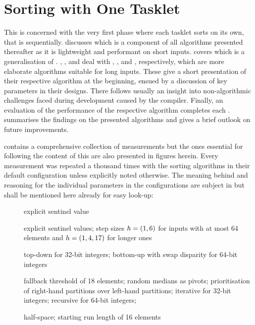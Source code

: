 \chapter{Sorting with One Tasklet}
\label{sec:tasklet}

This  is concerned with the very first phase where each tasklet sorts on its own, that is sequentially.
 discusses \IS{} which is a component of all algorithms presented thereafter as it is lightweight and performant on short inputs.
 covers \ShS{} which is a generalisation of \IS{}.
\hyperref[sec:tasklet:heap]{ }, , and  deal with \HS{}, \QS{}, and \MS{}, respectively, which are more elaborate algorithms suitable for long inputs.
These  give a short presentation of their respective algorithm at the beginning, ensued by a discussion of key parameters in their designs.
There follows usually an insight into non-algorithmic challenges faced during development caused by the compiler.
Finally, an evaluation of the performance of the respective algorithm completes each .
 summarises the findings on the presented algorithms and gives a brief outlook on future improvements.

 contains a comprehensive collection of measurements but the ones essential for following the content of this  are also presented in figures herein.
Every measurement was repeated a thousand times with the sorting algorithms in their default configuration unless explicitly noted otherwise.
The meaning behind and reasoning for the individual parameters in the configurations are subject in  but shall be mentioned here already for easy look-up:
\begin{description}
	\item[\IS{}]
	explicit sentinel value

	\item[\ShS{}]
	explicit sentinel values;
	step sizes \(h = (1, 6)\) for inputs with at most 64 elements and \(h = (1, 4, 17)\) for longer ones

	\item[\HS{}]
	top-down for 32-bit integers;
	bottom-up with swap disparity for 64-bit integers

	\item[\QS{}]
	fallback threshold of 18 elements;
	random medians as pivots;
	prioritisation of right-hand partitions over left-hand partitions;
	iterative for 32-bit integers;
	recursive for 64-bit integers;

	\item[\MS{}]
	half-space;
	starting run length of 16 elements
\end{description}

\clearpage


\clearpage


\clearpage


\clearpage


\clearpage


\clearpage

